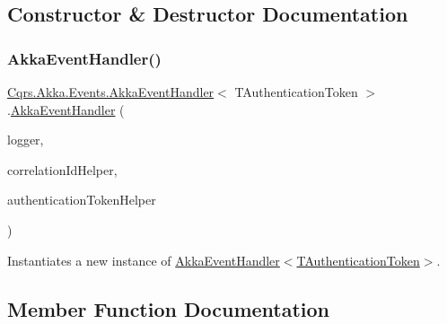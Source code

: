 \subsection{Constructor \& Destructor Documentation}
\mbox{\label{classCqrs_1_1Akka_1_1Events_1_1AkkaEventHandler_aee50c0ed50e291f311721ca6a103c41f_aee50c0ed50e291f311721ca6a103c41f}} 
\subsubsection{\texorpdfstring{Akka\+Event\+Handler()}{AkkaEventHandler()}}
{\footnotesize\ttfamily \hyperlink{classCqrs_1_1Akka_1_1Events_1_1AkkaEventHandler}{Cqrs.\+Akka.\+Events.\+Akka\+Event\+Handler}$<$ T\+Authentication\+Token $>$.\hyperlink{classCqrs_1_1Akka_1_1Events_1_1AkkaEventHandler}{Akka\+Event\+Handler} (\begin{DoxyParamCaption}\item[{I\+Logger}]{logger,  }\item[{I\+Correlation\+Id\+Helper}]{correlation\+Id\+Helper,  }\item[{\hyperlink{interfaceCqrs_1_1Authentication_1_1IAuthenticationTokenHelper}{I\+Authentication\+Token\+Helper}$<$ T\+Authentication\+Token $>$}]{authentication\+Token\+Helper }\end{DoxyParamCaption})\hspace{0.3cm}{\ttfamily [protected]}}



Instantiates a new instance of \hyperlink{classCqrs_1_1Akka_1_1Events_1_1AkkaEventHandler_aee50c0ed50e291f311721ca6a103c41f_aee50c0ed50e291f311721ca6a103c41f}{Akka\+Event\+Handler$<$\+T\+Authentication\+Token$>$}. 



\subsection{Member Function Documentation}
\mbox{\label{classCqrs_1_1Akka_1_1Events_1_1AkkaEventHandler_af277504938e0513e05f3a8784ece2af2_af277504938e0513e05f3a8784ece2af2}} 
